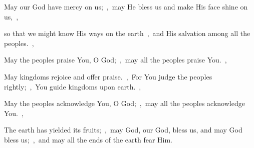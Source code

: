 \documentclass[12pt,twoside,a5paper]{article}
\begin{document}

\begin{normalparskip}
  May our God have mercy on us;~\sep\ may He bless us and make His face shine on us,~\sep


  so that we might know His ways on the earth~\sep\ and His salvation among all the peoples.~\sep

  May the peoples praise You, O God;~\sep\ may all the peoples praise You.~\sep

  May kingdoms rejoice and offer praise.~\sep\ For You judge the peoples rightly;~\sep\ You guide kingdoms upon earth.~\sep

  May the peoples acknowledge You, O God;~\sep\ may all the peoples acknowledge You.~\sep

  The earth has yielded its fruits;~\sep\ may God, our God, bless us, and may God bless us;~\sep\ and may all the ends of the earth fear Him.
\end{normalparskip}





\end{document}
